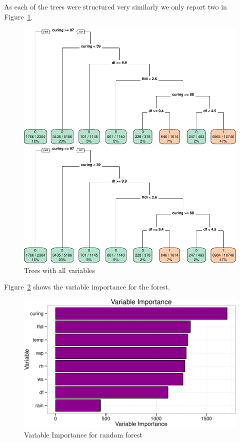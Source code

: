 \documentclass[11pt,a4paper]{article}
\begin{document}
As each of the trees were structured very similarly we only report two in Figure~\ref{fig:tree2}.

\begin{figure}
  \centering
	\includegraphics[page=1, width=\textwidth]{figures/trees2.pdf}\par\vspace*{1.5cm}\par
	\includegraphics[page=2, width=\textwidth]{figures/trees2.pdf}
  \caption{Trees with all variables}
  \label{fig:tree2}
\end{figure}

Figure~\ref{fig:vimp} shows the variable importance for the forest.


\begin{figure}
  \centering
  	\includegraphics[width=.7\textwidth]{figures/varimp.pdf}
  \caption{Variable Importance for random forest}
  \label{fig:vimp}
\end{figure}
\end{document}
